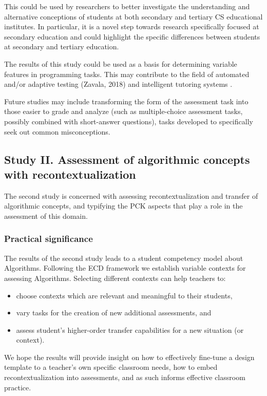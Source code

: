 This could be used by researchers to better investigate the understanding and alternative conceptions of students at both secondary and tertiary CS educational institutes. In particular, it is a novel step towards research specifically focused at secondary education and could highlight the specific differences between students at secondary and tertiary education.

The results of this study could be used as a basis for determining variable features in programming tasks. This may contribute to the field of automated and/or adaptive testing (Zavala, 2018) and intelligent tutoring systems \cite{LuxtonReilly2018}.


Future studies may include transforming the form of the assessment task into those easier to grade and analyze (such as multiple-choice assessment tasks, possibly combined with short-answer questions), tasks developed to specifically seek out common misconceptions.


\subsection{Study II. Assessment of algorithmic concepts with recontextualization}
The second study is concerned with assessing recontextualization and transfer of algorithmic concepts, and typifying the PCK aspects that play a role in the assessment of this domain.

\subsubsection*{Practical significance}

The results of the second study leads to a student competency model about Algorithms. Following the ECD framework we establish variable contexts for assessing Algorithms. Selecting different contexts can help teachers to:
\begin{itemize}
\item choose contexts which are relevant and meaningful to their students,
\item vary tasks for the creation of new additional assessments, and
\item assess student's higher-order transfer capabilities for a new situation (or context).
\end{itemize}
We hope the results will provide insight on how to effectively fine-tune a design template to a teacher's own specific classroom needs, how to embed recontextualization into assessments, and as such informs effective classroom practice.


